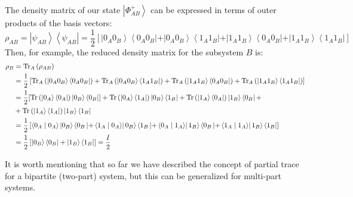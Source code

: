 The density matrix of our state $\left|\Phi^{+}_{A B}\right\rangle$ can be expressed in terms of outer products of the basis vectors:
$$
\rho_{A B}=\left|\psi_{A B}\right\rangle\left\langle\psi_{A B}\right|=\frac{1}{2}\left[\left|0_{A} 0_{B}\right\rangle\left\langle 0_{A} 0_{B}|+| 0_{A} 0_{B}\right\rangle\left\langle 1_{A} 1_{B}|+| 1_{A} 1_{B}\right\rangle\left\langle 0_{A} 0_{B}|+| 1_{A} 1_{B}\right\rangle\left\langle 1_{A} 1_{B}\right|\right]
$$
Then, for example, the reduced density matrix for the subsystem $B$ is:
\begin{align*}
\rho_{B} &=\operatorname{Tr}_{A}\left(\rho_{A B}\right) \\
&=\frac{1}{2}\left[\operatorname{Tr}_{A}\left(\left|0_{A} 0_{B}\right\rangle\left\langle 0_{A} 0_{B}\right|\right)+\operatorname{Tr}_{A}\left(\left|0_{A} 0_{B}\right\rangle\left\langle 1_{A} 1_{B}\right|\right)+\operatorname{Tr}_{A}\left(\left|1_{A} 1_{B}\right\rangle\left\langle 0_{A} 0_{B}\right|\right)+\operatorname{Tr}_{A}\left(\left|1_{A} 1_{B}\right\rangle\left\langle 1_{A} 1_{B}\right|\right)\right] \\
&=\frac{1}{2}[\operatorname{Tr}\left(\ket{0_A}\bra{0_A}\right)\ket{0_B}\bra{0_B}] +
\operatorname{Tr}\left(\ket{0_A}\bra{1_A}\right)\ket{0_B}\bra{1_B} + 
\operatorname{Tr}\left(\ket{1_A}\bra{0_A}\right)\ket{1_B}\bra{0_B}+ \\
&+ \operatorname{Tr}\left(\ket{1_A}\bra{1_A}\right)\ket{1_B}\bra{1_B}
\\
 &=\frac{1}{2}\left[\left\langle 0_{A} \mid 0_{A}\right\rangle\left|0_{B}\right\rangle\left\langle 0_{B}\left|+\left\langle 1_{A} \mid 0_{A}\right\rangle\right| 0_{B}\right\rangle\left\langle 1_{B}\left|+\left\langle 0_{A} \mid 1_{A}\right\rangle\right| 1_{B}\right\rangle\left\langle 0_{B}\left|+\left\langle 1_{A} \mid 1_{A}\right\rangle\right| 1_{B}\right\rangle\left\langle 1_{B}\right|\right] \\
 &=\frac{1}{2}\left[\left|0_{B}\right\rangle\left\langle 0_{B}|+| 1_{B}\right\rangle\left\langle 1_{B}\right|\right] =\frac{I}{2}
\end{align*}

It is worth mentioning that so far we have described the concept of partial trace for a bipartite (two-part) system, but this can be generalized for multi-part systems.




